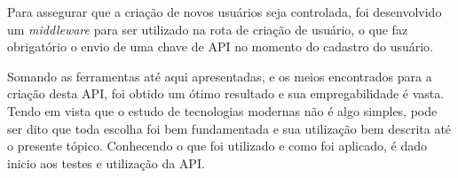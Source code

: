 Para assegurar que a criação de novos usuários seja controlada, foi desenvolvido um \textit{middleware} para ser utilizado na rota de criação de usuário, o que faz obrigatório o envio de uma chave de API no momento do cadastro do usuário.

Somando as ferramentas até aqui apresentadas, e os meios encontrados para a criação desta API, foi obtido um ótimo resultado e sua empregabilidade é vasta. Tendo em vista que o estudo de tecnologias modernas não é algo simples, pode ser dito que toda escolha foi bem fundamentada e sua utilização bem descrita até o presente tópico. Conhecendo o que foi utilizado e como foi aplicado, é dado inicio aos testes e utilização da API.
